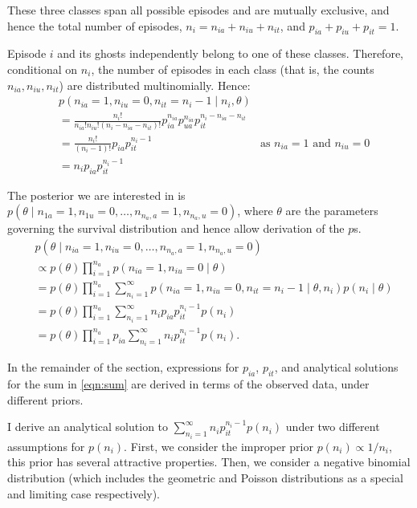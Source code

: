 \documentclass[thesis.tex]{subfiles}
\begin{document}
These three classes span all possible episodes and are mutually
exclusive, and hence the total number of episodes,
$n_i = n_{ia} + n_{iu} + n_{it}$, and
$p_{ia} + p_{iu} + p_{it} = 1$.

Episode $i$ and its ghosts independently belong to one of these
classes. Therefore, conditional on $n_i$, the number of episodes in
each class (that is, the counts $n_{ia}, n_{iu}, n_{it}$) are
distributed multinomially. Hence:
\begin{align}
&p(n_{ia} = 1, n_{iu} = 0, n_{it} = n_i - 1 \mid n_i, \theta) \\
&= \frac{n_i!}{n_{ia}! n_{iu}! (n_i- n_{ia} - n_{it})!} p_{ia}^{n_{ia}} p_{ua}^{n_{ia}} p_{it}^{n_i- n_{ia} - n_{it}} \\
&= \frac{n_i!}{(n_i-1)!} p_{ia} p_{it}^{n_i- 1} &\text{as $n_{ia} = 1$ and $n_{iu} = 0$}\\
&= n_i p_{ia} p_{it}^{n_i- 1}
\end{align}

The posterior we are interested in is
$p(\theta \mid n_{1a} = 1, n_{1u} = 0, \dots, n_{n_a,a} = 1, n_{n_a,u} = 0)$,
where $\theta$ are the parameters governing the survival distribution
and hence allow derivation of the $p$s.
\begin{align}
&p(\theta \mid n_{ia} = 1, n_{iu} = 0, \dots, n_{n_a,a} = 1, n_{n_a,u} = 0) \\
&\propto p(\theta) \prod_{i=1}^{n_a} p(n_{ia} = 1, n_{iu} = 0 \mid \theta) \\
&= p(\theta) \prod_{i=1}^{n_a} \sum_{n_i=1}^\infty p(n_{ia} = 1, n_{iu} = 0, n_{it} = n_i - 1 \mid \theta, n_i) p(n_i \mid \theta) \\
&= p(\theta) \prod_{i=1}^{n_a} \sum_{n_i=1}^\infty n_i p_{ia} p_{it}^{n_i- 1} p(n_i) \\
&= p(\theta) \prod_{i=1}^{n_a} p_{ia} \sum_{n_i=1}^\infty n_i p_{it}^{n_i- 1} p(n_i).\label{eqn:sum}
\end{align}


In the remainder of the section, expressions for $p_{ia}$,
$p_{it}$, and analytical solutions for the sum in \cref{eqn:sum} are derived in terms of the observed data, 
under different priors.

I derive an analytical solution to $\sum_{n_i=1}^\infty n_i p_{it}^{n_i- 1} p(n_i)$ under two different assumptions for $p(n_i)$.
First, we consider the improper prior $p(n_i) \propto 1/n_i$, this prior has several attractive properties.
Then, we consider a negative binomial distribution (which includes the geometric and Poisson distributions as a special and limiting case respectively).
\end{document}
